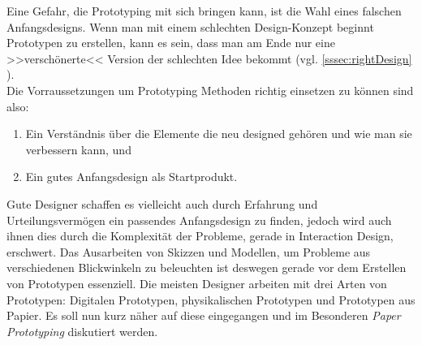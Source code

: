 Eine Gefahr, die Prototyping mit sich bringen kann, ist die Wahl eines falschen Anfangsdesigns. Wenn man mit einem schlechten Design-Konzept beginnt Prototypen zu erstellen, kann es sein, dass man am Ende nur eine >>verschönerte<< Version der schlechten Idee bekommt (vgl. \ref{sssec:rightDesign} ).\\ Die Vorraussetzungen um Prototyping Methoden richtig einsetzen zu können sind also:

\begin{enumerate}
	\item Ein Verständnis über die Elemente die neu designed gehören und wie man sie verbessern kann, und
	\item Ein gutes Anfangsdesign als Startprodukt.
\end{enumerate}
\begin{flushright}\citep{Dix:2004}\end{flushright}

Gute Designer schaffen es vielleicht auch durch Erfahrung und Urteilungsvermögen ein passendes Anfangsdesign zu finden, jedoch wird auch ihnen dies durch die Komplexität der Probleme, gerade in Interaction Design, erschwert. Das Ausarbeiten von Skizzen und Modellen, um Probleme aus verschiedenen Blickwinkeln zu beleuchten ist deswegen gerade vor dem Erstellen von Prototypen essenziell.
Die meisten Designer arbeiten mit drei Arten von Prototypen: Digitalen Prototypen, physikalischen Prototypen und Prototypen aus Papier. Es soll nun kurz näher auf diese eingegangen und im Besonderen \emph{Paper Prototyping} diskutiert werden. 

